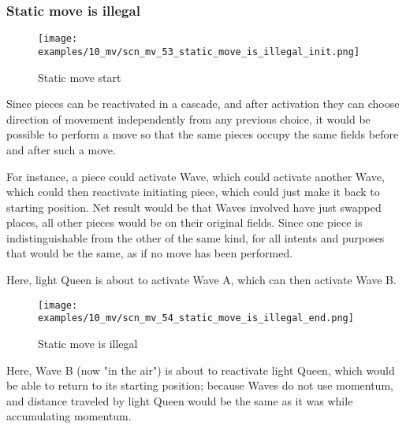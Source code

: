 \subsubsection*{Static move is illegal}
\label{sec:Miranda's veil/Wave/Cascading Waves/Static move is illegal}

\vspace*{-1.4\baselineskip}
\noindent
\begin{figure}[!h]
\texttt{[image: examples/10\_mv/scn\_mv\_53\_static\_move\_is\_illegal\_init.png]}
\vspace*{-1.3\baselineskip}
\caption{Static move start}
\label{fig:scn_mv_53_static_move_is_illegal_init}
\end{figure}

\vspace*{-0.4\baselineskip}
Since pieces can be reactivated in a cascade, and after activation they can choose
direction of movement independently from any previous choice, it would be possible
to perform a move so that the same pieces occupy the same fields before and after
such a move.

For instance, a piece could activate Wave, which could activate another Wave, which
could then reactivate initiating piece, which could just make it back to starting
position. Net result would be that Waves involved have just swapped places, all other
pieces would be on their original fields. Since one piece is indistinguishable from
the other of the same kind, for all intents and purposes that would be the same, as
if no move has been performed.

Here, light Queen is about to activate Wave A, which can then activate Wave B.

\clearpage %

\vspace*{-2.1\baselineskip}
\noindent
\begin{figure}[!h]
\texttt{[image: examples/10\_mv/scn\_mv\_54\_static\_move\_is\_illegal\_end.png]}
\vspace*{-1.3\baselineskip}
\caption{Static move is illegal}
\label{fig:scn_mv_54_static_move_is_illegal_end}
\end{figure}

\vspace*{-0.4\baselineskip}
Here, Wave B (now "in the air") is about to reactivate light Queen, which would be
able to return to its starting position; because Waves do not use momentum, and
distance traveled by light Queen would be the same as it was while accumulating
momentum.

